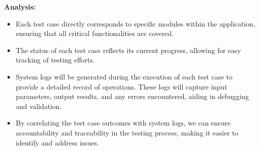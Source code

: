 \documentclass[12pt, titlepage]{article}
\begin{document}
\textbf{Analysis:}
\begin{itemize}
    \item Each test case directly corresponds to specific modules within the application, ensuring that all critical functionalities are covered.
    \item The status of each test case reflects its current progress, allowing for easy tracking of testing efforts.
    \item System logs will be generated during the execution of each test case to provide a detailed record of operations. These logs will capture input parameters, output results, and any errors encountered, aiding in debugging and validation.
    \item By correlating the test case outcomes with system logs, we can ensure accountability and traceability in the testing process, making it easier to identify and address issues.
\end{itemize}
				
\end{document}
